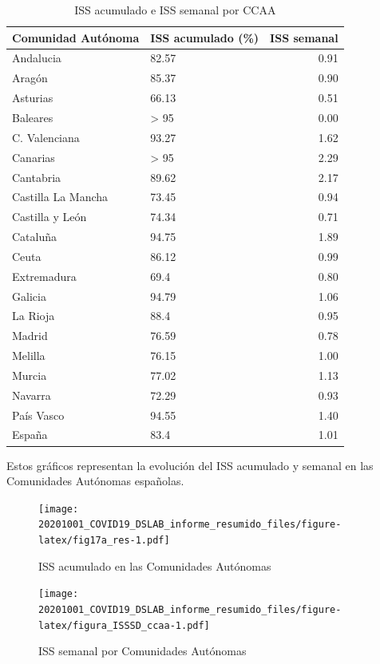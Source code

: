 \documentclass[
  11pt,
]{article}
\begin{document}
\begin{table}[!h]

\caption{\label{tab:tabla}ISS acumulado e ISS semanal por CCAA}
\centering
\fontsize{9}{11}\selectfont
\begin{tabular}[t]{l|l|r}
\hline
Comunidad Autónoma & ISS acumulado (\%) & ISS semanal\\
\hline
Andalucia & 82.57 & 0.91\\
\hline
Aragón & 85.37 & 0.90\\
\hline
Asturias & 66.13 & 0.51\\
\hline
Baleares & > 95 & 0.00\\
\hline
C. Valenciana & 93.27 & 1.62\\
\hline
Canarias & > 95 & 2.29\\
\hline
Cantabria & 89.62 & 2.17\\
\hline
Castilla La Mancha & 73.45 & 0.94\\
\hline
Castilla y León & 74.34 & 0.71\\
\hline
Cataluña & 94.75 & 1.89\\
\hline
Ceuta & 86.12 & 0.99\\
\hline
Extremadura & 69.4 & 0.80\\
\hline
Galicia & 94.79 & 1.06\\
\hline
La Rioja & 88.4 & 0.95\\
\hline
Madrid & 76.59 & 0.78\\
\hline
Melilla & 76.15 & 1.00\\
\hline
Murcia & 77.02 & 1.13\\
\hline
Navarra & 72.29 & 0.93\\
\hline
País Vasco & 94.55 & 1.40\\
\hline
España & 83.4 & 1.01\\
\hline
\end{tabular}
\end{table}

Estos gráficos representan la evolución del ISS acumulado y semanal en
las Comunidades Autónomas españolas.

\vspace{0.2cm}

\begin{figure}
\centering
\texttt{[image: 20201001\_COVID19\_DSLAB\_informe\_resumido\_files/figure-latex/fig17a\_res-1.pdf]}
\caption{\label{fig:fig17a_res} ISS acumulado en las Comunidades
Autónomas}
\end{figure}

\begin{figure}
\centering
\texttt{[image: 20201001\_COVID19\_DSLAB\_informe\_resumido\_files/figure-latex/figura\_ISSSD\_ccaa-1.pdf]}
\caption{\label{fig:figura_ISSSD_ccaa} ISS semanal por Comunidades
Autónomas}
\end{figure}
\end{document}

